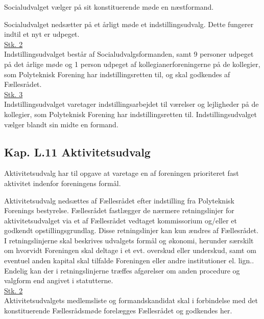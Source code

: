 \begin{list}
\item Socialudvalget vælger på sit konstituerende møde en næstformand.\\

\item Socialudvalget nedsætter på et årligt møde et indstillingsudvalg. Dette fungerer indtil et nyt er udpeget.\\

\underline{Stk. 2} \\
Indstillingsudvalget består af Socialudvalgsformanden, samt 9 personer udpeget på det årlige møde og 1 person udpeget af kollegianerforeningerne på de kollegier, som Polyteknisk Forening har indstillingsretten til, og skal godkendes af Fællesrådet.\\

\underline{Stk. 3} \\
Indstillingsudvalget varetager indstillingsarbejdet til værelser og lejligheder på de kollegier, som Polyteknisk Forening har indstillingsretten til. Indstillingsudvalget vælger blandt sin midte en formand.



\subsection*{Kap. L.11 Aktivitetsudvalg}
\label{L:kap:aktivitetsudvalg}
\item Aktivitetsudvalg har til opgave at varetage en af foreningen prioriteret fast aktivitet indenfor foreningens formål.

\item \label{L:Aktivitet:nedsaettelse} Aktivitetsudvalg nedsættes af Fællesrådet efter indstilling fra Polyteknisk Forenings bestyrelse. Fællesrådet fastlægger de nærmere retningslinjer for aktivitetsudvalget via et af Fællesrådet vedtaget kommissorium og/eller et godkendt opstillingsgrundlag. Disse retningslinjer kan kun ændres af Fællesrådet. I retningslinjerne skal beskrives udvalgets formål og økonomi, herunder særskilt om hvorvidt Foreningen skal deltage i et evt. overskud eller underskud, samt om eventuel anden kapital skal tilfalde Foreningen eller andre institutioner el. lign.. Endelig kan der i retningslinjerne træffes afgørelser om anden procedure og valgform end angivet i statutterne.\\

\underline{Stk. 2}\\
Aktivitetsudvalgets medlemsliste og formandskandidat skal i forbindelse med det konstituerende Fællesrådsmøde forelægges Fællesrådet og godkendes her.\\


\end{list}
